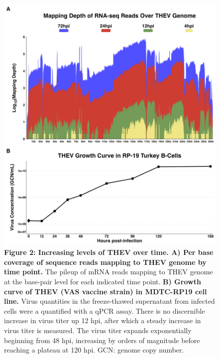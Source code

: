 \documentclass[
]{article}
\begin{document}
\begin{figure}
\centering
\includegraphics{results/r/figures/figure2.png}
\caption{\textbf{Figure 2: Increasing levels of THEV over time. A) Per
base coverage of sequence reads mapping to THEV genome by time point.}
The pileup of mRNA reads mapping to THEV genome at the base-pair level
for each indicated time point. \textbf{B) Growth curve of THEV (VAS
vaccine strain) in MDTC-RP19 cell line.} Virus quantities in the
freeze-thawed supernatant from infected cells were a quantified with a
qPCR assay. There is no discernible increase in virus titer up 12 hpi,
after which a steady increase in virus titer is measured. The virus
titer expands exponentially beginning from 48 hpi, increasing by orders
of magnitude before reaching a plateau at 120 hpi. GCN: genome copy
number.}
\end{figure}
\end{document}
